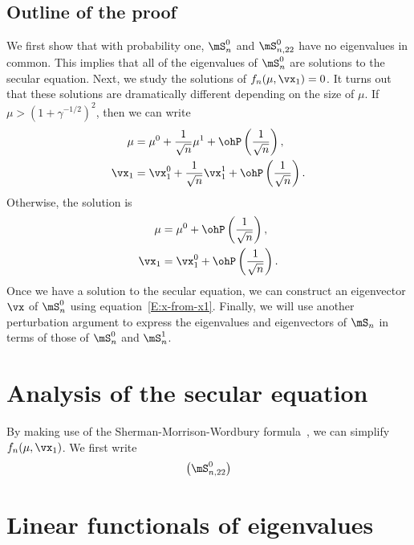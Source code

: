 \subsection{Outline of the proof}

We first show that with probability one, $\mS_n^0$ and $\mS_{n,22}^0$ have no eigenvalues in common.  This implies that all of the eigenvalues of $\mS_n^0$ are solutions to the secular equation.  Next, we study the solutions of 
$f_n(\mu, \vx_1) = 0$.  It turns out that these solutions are dramatically different depending on the size of $\mu$.  If $\mu > (1 + \gamma^{-1/2})^2$,
then we can write
\begin{align*}
    \mu 
        &= 
            \mu^0 
            + 
            \frac{1}{\sqrt{n}}
            \mu^1 
            + 
            \ohP\left( \frac{1}{\sqrt{n}} \right), \\
    \vx_1
        &=
            \vx_1^0
            +
            \frac{1}{\sqrt{n}}
            \vx_1^1
            + 
            \ohP\left( \frac{1}{\sqrt{n}} \right).
\end{align*}
Otherwise, the solution is
\begin{align*}
    \mu
        &=
            \mu^0
            + 
            \ohP\left( \frac{1}{\sqrt{n}} \right), \\
    \vx_1
        &=
            \vx_1^0
            +
            \ohP\left( \frac{1}{\sqrt{n}} \right).
\end{align*}
Once we have a solution to the secular equation, we can construct an
eigenvector $\vx$ of $\mS_n^0$ using equation~\eqref{E:x-from-x1}.  Finally, we will use another perturbation argument to express the eigenvalues and eigenvectors of $\mS_n$ in terms of those of $\mS_n^0$ and $\mS_n^1$.

\section{Analysis of the secular equation}

By making use of the Sherman-Morrison-Wordbury formula~\cite{golub1996mc}, we can simplify $f_n(\mu, \vx_1)$.  We first write
\begin{align*}
    \left(
        \mS_{n,22}^0
    \right)
\end{align*}

\clearpage



\section{Linear functionals of eigenvalues}


